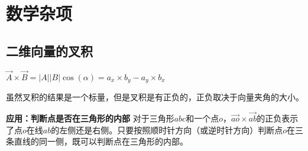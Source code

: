 \section{数学杂项}
\subsection{二维向量的叉积}
$\vec{A}\times\vec{B} = |A||B|\cos(\alpha)= a_x\times b_y-a_y\times b_x$

虽然叉积的结果是一个标量，但是叉积是有正负的，正负取决于向量夹角的大小。

\textbf{应用：判断点是否在三角形的内部}
对于三角形$abc$和一个点$o$，$\vec{ao}\times\vec{ab}$的正负表示了点$o$在线$ab$的左侧还是右侧。只要按照顺时针方向（或逆时针方向）判断点$o$在三条直线的同一侧，既可以判断点在三角形的内部。



